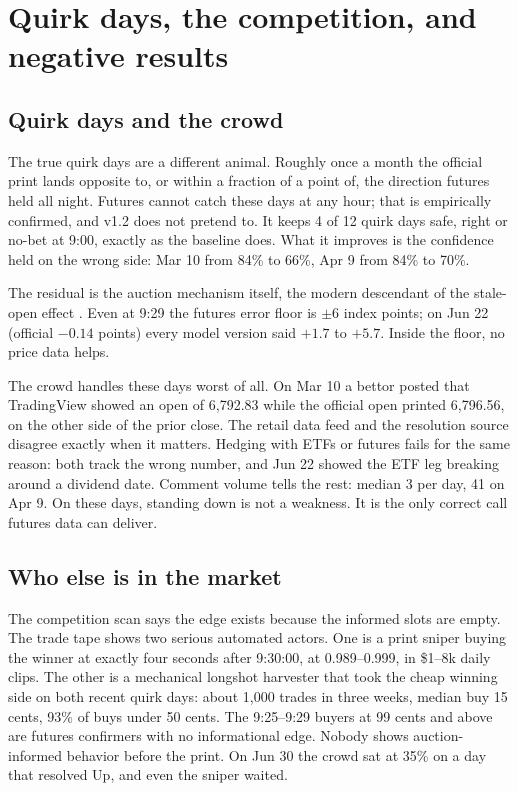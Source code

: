 \section{Quirk days, the competition, and negative results}
\label{app:market}

\subsection{Quirk days and the crowd}
\label{app:market_quirks}

The true quirk days are a different animal. Roughly once a month the
official print lands opposite to, or within a fraction of a point of, the
direction futures held all night. Futures cannot catch these days at any
hour; that is empirically confirmed, and v1.2 does not pretend to. It
keeps 4 of 12 quirk days safe, right or no-bet at 9:00, exactly as
the baseline does. What it improves is the confidence held on the wrong
side: Mar 10 from 84\% to 66\%, Apr 9 from 84\% to 70\%.

The residual is the auction mechanism itself, the modern descendant of
the stale-open effect \citep{stollwhaley1990}. Even at 9:29 the
futures error floor is $\pm 6$ index points; on Jun 22 (official $-0.14$
points) every model version said $+1.7$ to $+5.7$. Inside the floor, no
price data helps.

The crowd handles these days worst of all. On Mar 10 a bettor posted that
TradingView showed an open of 6{,}792.83 while the official open printed
6{,}796.56, on the other side of the prior close. The retail data feed
and the resolution source disagree exactly when it matters. Hedging with
ETFs or futures fails for the same reason: both track the wrong number,
and Jun 22 showed the ETF leg breaking around a dividend date. Comment
volume tells the rest: median 3 per day, 41 on Apr 9. On these days,
standing down is not a weakness. It is the only correct call futures data
can deliver.

\subsection{Who else is in the market}
\label{app:market_competition}

The competition scan says the edge exists because the informed slots are
empty. The trade tape shows two serious automated actors. One is a print
sniper buying the winner at exactly four seconds after 9:30:00, at
0.989--0.999, in \$1--8k daily clips. The other is a mechanical longshot
harvester that took the cheap winning side on both recent quirk days:
about 1{,}000 trades in three weeks, median buy 15 cents, 93\% of buys
under 50 cents. The 9:25--9:29 buyers at 99 cents and above are
futures confirmers with no informational edge. Nobody shows
auction-informed behavior before the print. On Jun 30 the crowd sat at
35\% on a day that resolved Up, and even the sniper waited.

